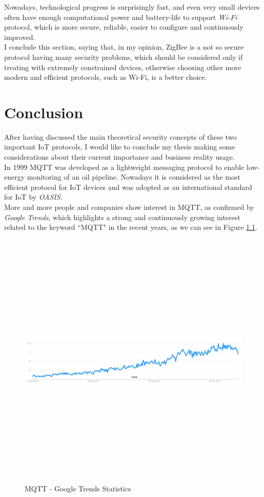 \documentclass[12pt]{report}
\begin{document}
Nowadays, technological progress is surprisingly fast, and even very small devices often have enough computational power and battery-life to support \emph{Wi-Fi} protocol, which is more secure, reliable, easier to configure and continuously improved.\\
I conclude this section, saying that, in my opinion, ZigBee is a not so secure protocol having many security problems, which should be considered only if treating with extremely constrained devices, otherwise choosing other more modern and efficient protocols, such as Wi-Fi, is a better choice.\\

\chapter{Conclusion}

After having discussed the main theoretical security concepts of these two important IoT protocols, I would like to conclude my thesis making some considerations about their current importance and business reality usage.\\

In 1999 MQTT was developed as a lightweight messaging protocol to enable low-energy monitoring of an oil pipeline. Nowadays it is considered as the most efficient protocol for IoT devices and was adopted as an international standard for IoT by \emph{OASIS}.\\

More and more people and companies show interest in MQTT, as confirmed by \emph{Google Trends}, which highlights a strong and continuously growing interest related to the keyword ``MQTT" in the recent years, as we can see in Figure \ref{fig:mqtt_googletrends}.

\begin{figure}[H]
\includegraphics[width=14cm,height=12.5cm,keepaspectratio]{mqtt_googletrends}
\centering
\caption{MQTT - Google Trends Statistics}
\label{fig:mqtt_googletrends}
\end{figure}
\end{document}
